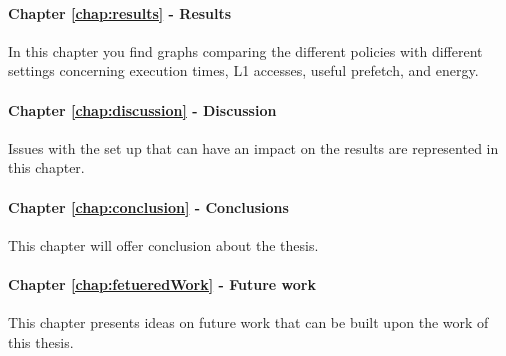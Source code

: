 \paragraph{Chapter \ref{chap:results} - Results} In this chapter you find graphs comparing the different policies
with different settings concerning execution times, L1 accesses, useful prefetch, and energy.
\paragraph{Chapter \ref{chap:discussion} - Discussion} Issues with the set up that can have an impact on the results are represented in this chapter.
\paragraph{Chapter \ref{chap:conclusion} - Conclusions} This chapter will offer conclusion about the thesis.
\paragraph{Chapter \ref{chap:fetueredWork} - Future work} This chapter presents ideas on future work that can be built upon the work of this thesis.
